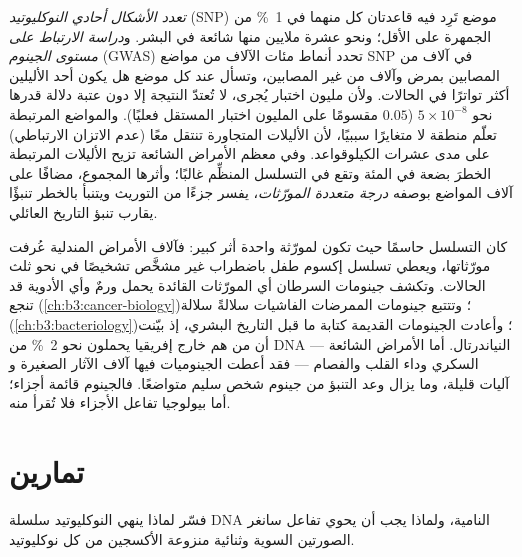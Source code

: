 \begin{definition}\label{def:b3:genomics:gwas}
\emph{تعدد الأشكال أحادي النوكليوتيد} (SNP) موضع تَرِد فيه
قاعدتان كل منهما في \qty{1}{\%} من الجمهرة على الأقل؛ ونحو
عشرة ملايين منها شائعة في البشر. و\emph{دراسة الارتباط على مستوى
الجينوم} (GWAS) تحدد أنماط مئات الآلاف من مواضع SNP في آلاف
من المصابين بمرض وآلاف من غير المصابين، وتسأل عند كل موضع
هل يكون أحد الأليلين أكثر تواترًا في الحالات. ولأن مليون
اختبار يُجرى، لا تُعتدّ النتيجة إلا دون عتبة دلالة
قدرها نحو $5\times 10^{-8}$ ($0.05$ مقسومًا على المليون اختبار
المستقل فعليًا). والمواضع المرتبطة تعلّم منطقة لا متغايرًا
سببيًا، لأن الأليلات المتجاورة تنتقل معًا (عدم الاتزان
الارتباطي) على مدى عشرات الكيلوقواعد. وفي معظم الأمراض الشائعة
تزيح الأليلات المرتبطة الخطرَ بضعة في المئة وتقع في
التسلسل المنظِّم غالبًا؛ وأثرها المجموع، مضافًا على آلاف
المواضع بوصفه \emph{درجة متعددة المورّثات}، يفسر جزءًا من
التوريث ويتنبأ بالخطر تنبؤًا يقارب تنبؤ التاريخ العائلي.
\end{definition}

\begin{remark}\label{rem:b3:genomics:delivered}
كان التسلسل حاسمًا حيث تكون لمورّثة واحدة أثر كبير:
فآلاف الأمراض المندلية عُرفت مورّثاتها، ويعطي تسلسل
إكسوم طفل باضطراب غير مشخَّص تشخيصًا في
نحو ثلث الحالات. وتكشف جينومات السرطان أي المورّثات القائدة يحمل
ورمٌ وأي الأدوية قد تنجع (\cref{ch:b3:cancer-biology})؛
وتتتبع جينومات الممرضات الفاشيات سلالةً سلالة
(\cref{ch:b3:bacteriology})؛ وأعادت الجينومات القديمة كتابة ما قبل
التاريخ البشري، إذ بيّنت أن من هم خارج إفريقيا يحملون نحو \qty{2}{\%}
من DNA النياندرتال. أما الأمراض الشائعة --- السكري وداء القلب
والفصام --- فقد أعطت الجينوميات فيها آلاف الآثار الصغيرة و
آليات قليلة، وما يزال وعد التنبؤ من جينوم شخص
سليم متواضعًا. فالجينوم قائمة أجزاء؛ أما
بيولوجيا تفاعل الأجزاء فلا تُقرأ منه.
\end{remark}

\section{تمارين}

\begin{exercise}[$\star$]\label{exo:b3:genomics:1}
فسّر لماذا ينهي النوكليوتيد  سلسلة DNA النامية،
ولماذا يجب أن يحوي تفاعل سانغر الصورتين السوية وثنائية منزوعة
الأكسجين من كل نوكليوتيد.
\end{exercise}

